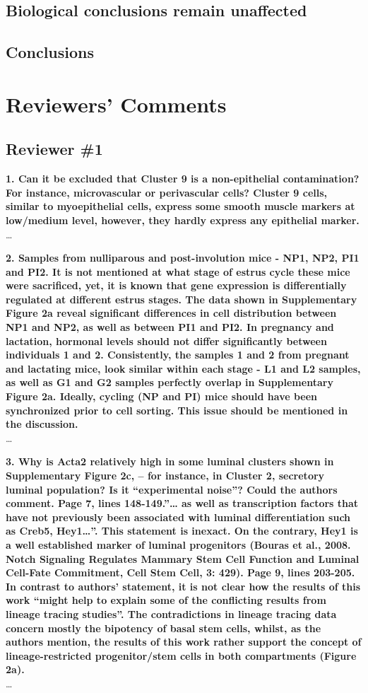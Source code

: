 \documentclass{article}
\begin{document}
\subsection*{Biological conclusions remain unaffected}
\subsection*{Conclusions}
\newpage
\section*{Reviewers' Comments}
\subsection*{Reviewer \#1}
\textbf{1. Can it be excluded that Cluster 9 is a non-epithelial contamination? For instance, microvascular or perivascular cells? Cluster 9 cells, similar to myoepithelial cells, express some smooth muscle markers at low/medium level, however, they hardly express any epithelial marker.}\\
\ldots

\textbf{2. Samples from nulliparous and post-involution mice - NP1, NP2, PI1 and PI2. It is not mentioned at what stage of estrus cycle these mice were sacrificed, yet, it is known that gene expression is differentially regulated at different estrus stages. The data shown in Supplementary Figure 2a reveal significant differences in cell distribution between NP1 and NP2, as well as between PI1 and PI2. In pregnancy and lactation, hormonal levels should not differ significantly between individuals 1 and 2. Consistently, the samples 1 and 2 from pregnant and lactating mice, look similar within each stage - L1 and L2 samples, as well as G1 and G2 samples perfectly overlap in Supplementary Figure 2a. Ideally, cycling (NP and PI) mice should have been synchronized prior to cell sorting. This issue should be mentioned in the discussion.}\\
\ldots

\textbf{3. Why is Acta2 relatively high in some luminal clusters shown in Supplementary Figure 2c, – for instance, in Cluster 2, secretory luminal population? Is it “experimental noise”? Could the authors comment.
Page 7, lines 148-149.”… as well as transcription factors that have not previously been associated with luminal differentiation such as Creb5, Hey1…”. This statement is inexact. On the contrary, Hey1 is a well established marker of luminal progenitors (Bouras et al., 2008. Notch Signaling Regulates Mammary Stem Cell Function and Luminal Cell-Fate Commitment, Cell Stem Cell, 3: 429).
Page 9, lines 203-205. In contrast to authors’ statement, it is not clear how the results of this work “might help to explain some of the conflicting results from lineage tracing studies”. The contradictions in lineage tracing data concern mostly the bipotency of basal stem cells, whilst, as the authors mention, the results of this work rather support the concept of lineage-restricted progenitor/stem cells in both compartments (Figure 2a).}\\
\ldots
\end{document}
